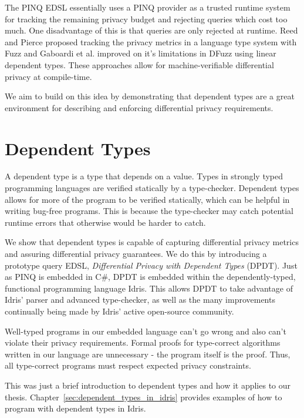 \documentclass[12pt]{report}
\begin{document}
The PINQ EDSL essentially uses a PINQ provider as a trusted runtime system for tracking the remaining privacy budget and rejecting queries which cost too much.
One disadvantage of this is that queries are only rejected at runtime.
Reed and Pierce proposed tracking the privacy metrics in a language type system with Fuzz\cite{conf/icfp/ReedP10} and Gaboardi et al. improved on it's limitations in DFuzz\cite{conf/popl/GaboardiHHNP13} using linear dependent types.
These approaches allow for machine-verifiable differential privacy at compile-time.

We aim to build on this idea by demonstrating that dependent types are a great environment for describing and enforcing differential privacy requirements.

\section{Dependent Types}\label{sec:intro-deptyps}

A dependent type is a type that depends on a value.
Types in strongly typed programming languages are verified statically by a type-checker.
Dependent types allows for more of the program to be verified statically, which can be helpful in writing bug-free programs.
This is because the type-checker may catch potential runtime errors that otherwise would be harder to catch.

We show that dependent types is capable of capturing differential privacy metrics and assuring differential privacy guarantees.
We do this by introducing a prototype query EDSL, \textit{Differential Privacy with Dependent Types} (DPDT).
Just as PINQ is embedded in C\#, DPDT is embedded within the dependently-typed, functional programming language Idris.
This allows DPDT to take advantage of Idris' parser and advanced type-checker, as well as the many improvements continually being made by Idris' active open-source community.

Well-typed programs in our embedded language can't go wrong and also can't violate their privacy requirements.
Formal proofs for type-correct algorithms written in our language are unnecessary - the program itself is the proof.
Thus, all type-correct programs must respect expected privacy constraints.

This was just a brief introduction to dependent types and how it applies to our thesis.
Chapter~\ref{sec:dependent_types_in_idris} provides examples of how to program with dependent types in Idris.
\end{document}

